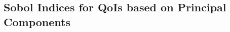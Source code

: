 \subsection{Sobol Indices for QoIs based on Principal Components}\label{sub:sa_application_pca_sobol}
